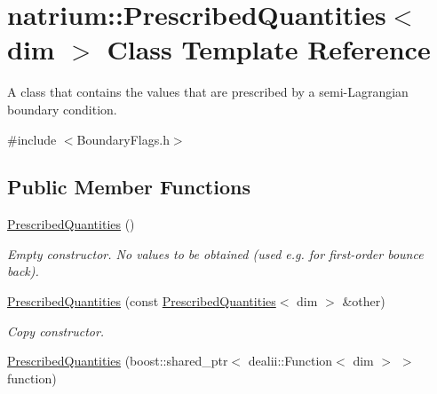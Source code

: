 \hypertarget{classnatrium_1_1PrescribedQuantities}{
\section{natrium::PrescribedQuantities$<$ dim $>$ Class Template Reference}
\label{classnatrium_1_1PrescribedQuantities}
}


A class that contains the values that are prescribed by a semi-\/Lagrangian boundary condition.  


{\ttfamily \#include $<$BoundaryFlags.h$>$}\subsection*{Public Member Functions}
\begin{DoxyCompactItemize}
\item 
\hypertarget{classnatrium_1_1PrescribedQuantities_abc9664c2fce9fd27a5dabe3e9f81445a}{
\hyperlink{classnatrium_1_1PrescribedQuantities_abc9664c2fce9fd27a5dabe3e9f81445a}{PrescribedQuantities} ()}
\label{classnatrium_1_1PrescribedQuantities_abc9664c2fce9fd27a5dabe3e9f81445a}

\begin{DoxyCompactList}\small\item\em Empty constructor. No values to be obtained (used e.g. for first-\/order bounce back). \item\end{DoxyCompactList}\item 
\hypertarget{classnatrium_1_1PrescribedQuantities_a426833bf287b714bee8773f9465331c1}{
\hyperlink{classnatrium_1_1PrescribedQuantities_a426833bf287b714bee8773f9465331c1}{PrescribedQuantities} (const \hyperlink{classnatrium_1_1PrescribedQuantities}{PrescribedQuantities}$<$ dim $>$ \&other)}
\label{classnatrium_1_1PrescribedQuantities_a426833bf287b714bee8773f9465331c1}

\begin{DoxyCompactList}\small\item\em Copy constructor. \item\end{DoxyCompactList}\item 
\hypertarget{classnatrium_1_1PrescribedQuantities_a79275b33e2aa0222def655b973c352b6}{
\hyperlink{classnatrium_1_1PrescribedQuantities_a79275b33e2aa0222def655b973c352b6}{PrescribedQuantities} (boost::shared\_\-ptr$<$ dealii::Function$<$ dim $>$ $>$ function)}
\label{classnatrium_1_1PrescribedQuantities_a79275b33e2aa0222def655b973c352b6}


\end{DoxyCompactItemize}
